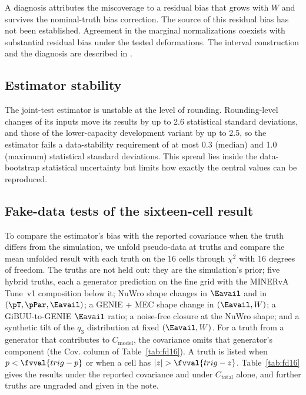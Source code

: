 A diagnosis attributes the miscoverage to a residual bias that grows with $W$ and survives the nominal-truth bias
correction.
The source of this residual bias has not been established.
Agreement in the marginal normalizations coexists with substantial residual bias under the tested deformations.
The interval construction and the diagnosis are described in .

\subsection{Estimator stability}
\label{sec:cov5d}

The joint-test estimator is unstable at the level of rounding.
Rounding-level changes of its inputs move its results by up to 2.6 statistical standard deviations, and those of
the lower-capacity development variant by up to 2.5, so the estimator fails a data-stability requirement of at most 0.3 (median)
and 1.0 (maximum) statistical standard deviations.
This spread lies inside the data-bootstrap statistical uncertainty but limits how exactly the central values can be
reproduced.

\subsection{Fake-data tests of the sixteen-cell result}
\label{sec:fd16}

To compare the estimator's bias with the reported covariance when the truth differs from the simulation, we unfold
pseudo-data at  truths and compare the mean unfolded result with each truth on the 16 cells
through $\chi^2$ with 16 degrees of freedom.
The truths are not held out: they are the simulation's prior; five hybrid truths, each a generator prediction on
the fine grid with the MINERvA Tune~v1 composition below it; NuWro shape changes in $\Eavail$ and in
$(\pT,\pPar,\Eavail)$; a GENIE + MEC shape change in $(\Eavail,W)$; a GiBUU-to-GENIE $\Eavail$ ratio; a noise-free
closure at the NuWro shape; and a synthetic tilt of the $q_3$ distribution at fixed $(\Eavail,W)$.
For a truth from a generator that contributes to $C_{\mathrm{model}}$, the covariance omits that generator's
component (the Cov. column of Table~\ref{tab:fd16}).
A truth is listed when $p<\fvval{trig-p}$ or when a cell has $|z|>\fvval{trig-z}$.
Table~\ref{tab:fd16} gives the results under the reported covariance and under $C_{\mathrm{total}}$ alone, and
 further truths are ungraded and given in the note.

